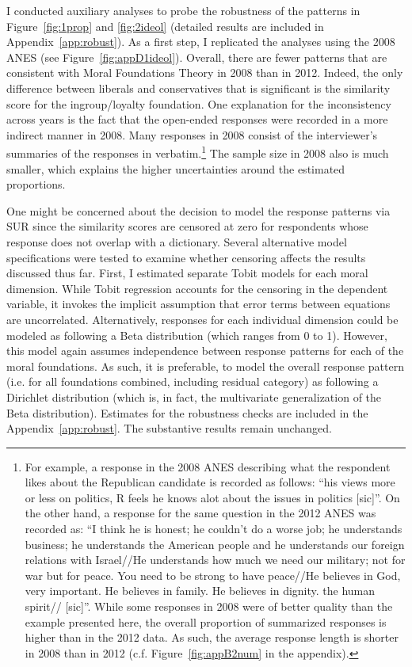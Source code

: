\documentclass[12pt]{article}
\begin{document}
I conducted auxiliary analyses to probe the robustness of the patterns in Figure~\ref{fig:1prop} and \ref{fig:2ideol} (detailed results are included in Appendix~\ref{app:robust}). As a first step, I replicated the analyses using the 2008 ANES (see Figure~\ref{fig:appD1ideol}). Overall, there are fewer patterns that are consistent with Moral Foundations Theory in 2008 than in 2012. Indeed, the only difference between liberals and conservatives that is significant is the similarity score for the ingroup/loyalty foundation. One explanation for the inconsistency across years is the fact that the open-ended responses were recorded in a more indirect manner in 2008. Many responses in 2008 consist of the interviewer's summaries of the responses in verbatim.\footnote{For example, a response in the 2008 ANES describing what the respondent likes about the Republican candidate is recorded as follows: ``his views more or less on politics, R feels he knows alot about the issues in politics
[sic]''. On the other hand, a response for the same question in the 2012 ANES was recorded as: ``I think he is honest; he couldn't do a worse job; he understands business; he understands the American people and he understands our foreign relations with Israel//He understands how much we need our military; not for war but for peace. You need to be strong to have peace//He believes in God, very important. He believes in family. He believes in dignity. the human spirit// [sic]''. While some responses in 2008 were of better quality than the example presented here, the overall proportion of summarized responses is higher than in the 2012 data. As such, the average response length is shorter in 2008 than in 2012 (c.f. Figure~\ref{fig:appB2num} in the appendix).} The sample size in 2008 also is much smaller, which explains the higher uncertainties around the estimated proportions.

One might be concerned about the decision to model the response patterns via SUR since the similarity scores are censored at zero for respondents whose response does not overlap with a dictionary. Several alternative model specifications were tested to examine whether censoring affects the results discussed thus far. First, I estimated separate Tobit models for each moral dimension. While Tobit regression accounts for the censoring in the dependent variable, it invokes the implicit assumption that error terms between equations are uncorrelated. Alternatively, responses for each individual dimension could be modeled as following a Beta distribution (which ranges from 0 to 1). However, this model again assumes independence between response patterns for each of the moral foundations. As such, it is preferable, to model the overall response pattern (i.e. for all foundations combined, including residual category) as following a Dirichlet distribution (which is, in fact, the multivariate generalization of the Beta distribution). Estimates for the robustness checks are included in the Appendix~\ref{app:robust}. The substantive results remain unchanged.
\end{document}
